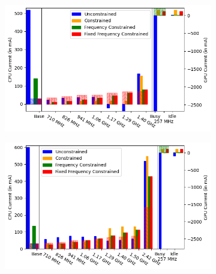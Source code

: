 \begin{figure}[tp]
    \centering
     \begin{subfigure}[b]{0.32\textwidth}
         \centering
         \includegraphics[width=\textwidth]{figures/004_Pixel4_bricksbreaker_menu_50_1_equations.png}
         \label{fig:number_parameters_vs_duration_100s_0}
     \end{subfigure}
    \begin{subfigure}[b]{0.32\textwidth}
         \centering
         \includegraphics[width=\textwidth]{figures/004_Pixel4_bricksbreaker_menu_250_1_equations.png}
         \label{fig:number_parameters_vs_duration_100s_100}
     \end{subfigure}
    \begin{subfigure}[b]{0.32\textwidth}
         \centering

\end{subfigure}
\end{figure}
